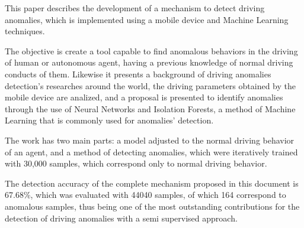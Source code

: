 \bigskip

This paper describes the development of a mechanism to detect driving anomalies, which is implemented using a mobile device and Machine Learning techniques.


The objective is create a tool capable to find anomalous behaviors in the driving of human or autonomous agent, having a previous knowledge of normal driving conducts of them. Likewise it presents a background of driving anomalies detection's researches around the world, the driving parameters obtained by the mobile device are analized, and a proposal is presented to identify anomalies through the use of Neural Networks and Isolation Forests, a method of Machine Learning that is commonly used for anomalies' detection. 


The work has two main parts: a model adjusted to the normal driving behavior of an agent, and a method of detecting anomalies, which were iteratively trained with 30,000 samples, which correspond only to normal driving behavior.


The detection accuracy of the complete mechanism proposed in this document is 67.68\%, which was evaluated with 44040 samples, of which 164 correspond to anomalous samples, thus being one of the most outstanding contributions for the detection of driving anomalies with a semi supervised approach.

